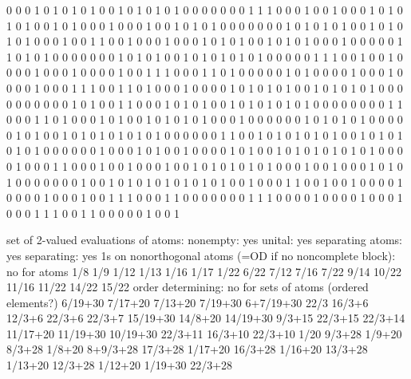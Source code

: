 0 0 0 1 0 1 0 1 0 1 0 0 1 0 1 0 1 0 1 0 0 0 0 0 0 0 1 1 1 0 0 0 1 0
0 1 0 0 0 1 0 1 0 1 0 1 0 0 1 0 1 0 0 0 1 0 0 0 1 0 0 1 0 1 0 1 0 0
0 0 0 0 0 1 0 1 0 1 0 1 0 0 1 0 1 0 1 0 1 0 0 0 1 0 0 1 1 0 0 1 0 0
0 1 0 0 0 1 0 1 0 1 0 0 1 0 1 0 1 0 0 0 1 0 0 0 0 0 1 1 0 1 0 1 0 0
0 0 0 0 0 1 0 1 0 1 0 0 1 0 1 0 1 0 1 0 1 0 0 0 0 0 1 1 1 0 0 1 0 0
1 0 0 0 0 1 0 0 0 1 0 0 0 0 1 0 0 1 1 1 0 0 0 1 1 0 1 0 0 0 0 0 1 0
1 0 0 0 0 1 0 0 0 1 0 0 0 0 1 0 0 0 1 1 1 0 0 1 1 0 1 0 0 0 1 0 0 0
0 1 0 1 0 1 0 1 0 0 1 0 1 0 1 0 1 0 0 0 0 0 0 0 0 0 0 1 0 1 0 0 1 1
0 0 0 1 0 1 0 1 0 0 1 0 1 0 1 0 1 0 1 0 0 0 0 0 0 0 0 1 1 0 0 0 1 1
0 1 0 0 0 1 0 1 0 0 1 0 1 0 1 0 1 0 0 0 1 0 0 0 0 0 0 1 0 1 0 1 0 1
0 0 0 0 0 1 0 1 0 0 1 0 1 0 1 0 1 0 1 0 1 0 0 0 0 0 0 1 1 0 0 1 0 1
0 1 0 1 0 1 0 0 1 0 1 0 1 0 1 0 1 0 0 0 0 0 0 1 0 0 0 1 0 1 0 0 1 0
0 0 0 1 0 1 0 0 1 0 1 0 1 0 1 0 1 0 1 0 0 0 0 1 0 0 0 1 1 0 0 0 1 0
0 1 0 0 0 1 0 0 1 0 1 0 1 0 1 0 1 0 0 0 1 0 0 1 0 0 0 1 0 1 0 1 0 0
0 0 0 0 0 1 0 0 1 0 1 0 1 0 1 0 1 0 1 0 1 0 0 1 0 0 0 1 1 0 0 1 0 0
1 0 0 0 0 1 0 0 0 0 1 0 0 0 1 0 0 1 1 1 0 0 0 1 1 0 0 0 0 0 0 0 1 1
1 0 0 0 0 1 0 0 0 0 1 0 0 0 1 0 0 0 1 1 1 0 0 1 1 0 0 0 0 0 1 0 0 1

set of 2-valued evaluations of atoms:
nonempty: yes
unital: yes
separating atoms: yes
separating: yes
1s on nonorthogonal atoms (=OD if no noncomplete block): no for atoms
 1/8 1/9 1/12 1/13 1/16 1/17 1/22 6/22 7/12 7/16 7/22 9/14 10/22 11/16 11/22 14/22 15/22
order determining: no for sets of atoms (ordered elements?)
 6/19+30
 7/17+20
 7/13+20
 7/19+30
 6+7/19+30
 22/3
 16/3+6
 12/3+6
 22/3+6
 22/3+7
 15/19+30
 14/8+20
 14/19+30
 9/3+15
 22/3+15
 22/3+14
 11/17+20
 11/19+30
 10/19+30
 22/3+11
 16/3+10
 22/3+10
 1/20
 9/3+28
 1/9+20
 8/3+28
 1/8+20
 8+9/3+28
 17/3+28
 1/17+20
 16/3+28
 1/16+20
 13/3+28
 1/13+20
 12/3+28
 1/12+20
 1/19+30
 22/3+28


